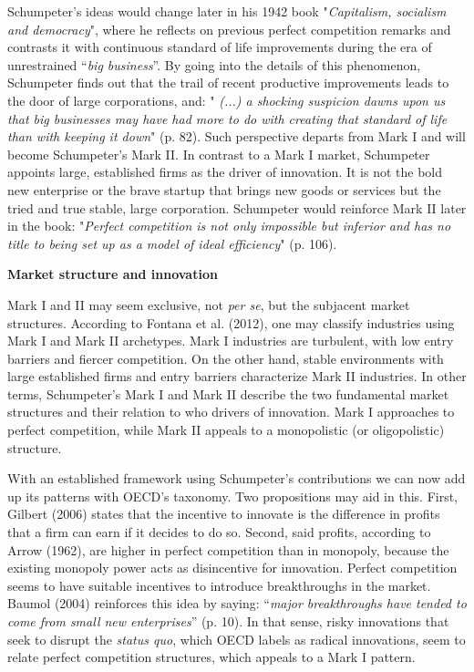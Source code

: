 \documentclass[12pt,a4paper]{article}
\begin{document}
Schumpeter's ideas would change later in his 1942 book "\textit{Capitalism, socialism and democracy}", where he reflects on previous perfect competition remarks and contrasts it with continuous standard of life improvements during the era of unrestrained “\textit{big business}”. By going into the details of this phenomenon, Schumpeter finds out that the trail of recent productive improvements leads to the door of large corporations, and: "\textit{ (...) a shocking suspicion dawns upon us that big businesses may have had more to do with creating that standard of life than with keeping it down}" (p. 82). Such perspective departs from Mark I and will become Schumpeter's Mark II. In contrast to a Mark I market, Schumpeter appoints large, established firms as the driver of innovation. It is not the bold new enterprise or the brave startup that brings new goods or services but the tried and true stable, large corporation. Schumpeter would reinforce Mark II later in the book: "\textit{Perfect competition is not only impossible but inferior and has no title to being set up as a model of ideal efficiency}" (p. 106).   

\noindent \textbf{Market structure and innovation }

Mark I and II may seem exclusive, not \textit{per se}, but the subjacent market structures. According to Fontana et al. (2012), one may classify industries using Mark I and Mark II archetypes. Mark I industries are turbulent, with low entry barriers and fiercer competition. On the other hand, stable environments with large established firms and entry barriers characterize Mark II industries. In other terms, Schumpeter's Mark I and Mark II describe the two fundamental market structures and their relation to who drivers of innovation. Mark I approaches to perfect competition, while Mark II appeals to a monopolistic (or oligopolistic) structure. 

With an established framework using Schumpeter's contributions we can now add up its patterns with OECD's taxonomy. Two propositions may aid in this. First, Gilbert (2006) states that the incentive to innovate is the difference in profits that a firm can earn if it decides to do so. Second, said profits, according to Arrow (1962), are higher in perfect competition than in monopoly, because the existing monopoly power acts as disincentive for innovation. Perfect competition seems to have suitable incentives to introduce breakthroughs in the market. Baumol (2004) reinforces this idea by saying: “\textit{major breakthroughs have tended to come from small new enterprises}” (p. 10). In that sense, risky innovations that seek to disrupt the \textit{status quo}, which OECD labels as radical innovations, seem to relate perfect competition structures, which appeals to a Mark I pattern.  
\end{document}

